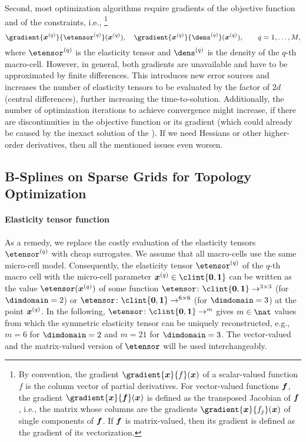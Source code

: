 Second, most optimization algorithms require gradients of the
objective function and of the constraints, i.e.,%
\footnote{%
  By convention, the gradient $\gradient{\*x}{f}(\*x)$ of a
  scalar-valued function $f$ is the column vector of partial derivatives.
  For vector-valued functions ${\boldsymbol{f}}$, the gradient $\gradient{\*x}{\*f}(\*x)$
  is defined as the transposed Jacobian of ${\boldsymbol{f}}$, i.e.,
  the matrix whose columns are the gradients $\gradient{\*x}{f_j}(\*x)$ of
  single components of ${\boldsymbol{f}}$.
  If ${\boldsymbol{f}}$ is matrix-valued, then its gradient is defined as the
  gradient of its vectorization.%
}
\begin{equation}
  \gradient{\*x^{(q)}}{\etensor^{(q)}}(\*x^{(q)}),\quad
  \gradient{\*x^{(q)}}{\dens^{(q)}}(\*x^{(q)}),\qquad
  q = 1, \dotsc, M,
\end{equation}
where $\etensor^{(q)}$ is the elasticity tensor and
$\dens^{(q)}$ is the density of the $q$-th macro-cell.
However, in general, both gradients are unavailable and
have to be approximated by finite differences.
This introduces new error sources and
increases the number of elasticity tensors to be evaluated
by the factor of $2d$ (central differences),
further increasing the time-to-solution.
Additionally, the number of optimization iterations to
achieve convergence might increase,
if there are discontinuities in the objective function
or its gradient
(which could already be caused by the inexact solution of the \fem).
If we need Hessians or other higher-order derivatives,
then all the mentioned issues even worsen.



\subsection{B-Splines on Sparse Grids for Topology Optimization}
\label{sec:622BSplines}

\paragraph{Elasticity tensor function}

As a remedy, we replace the costly evaluation of the
elasticity tensors $\etensor^{(q)}$ with cheap surrogates.
We assume that all macro-cells use the same micro-cell model.
Consequently, the elasticity tensor $\etensor^{(q)}$ of the $q$-th macro cell
with the micro-cell parameter $\*x^{(q)} \in \clint{\*0, \*1}$
can be written as the value $\etensor(\*x^{(q)})$ of some function
$\etensor\colon \clint{\*0, \*1} \to \real^{3 \times 3}$
(for $\dimdomain = 2$) or
$\etensor\colon \clint{\*0, \*1} \to \real^{6 \times 6}$
(for $\dimdomain = 3$) at the point ${\boldsymbol{x}}^{(q)}$.
In the following,
$\etensor\colon \clint{\*0, \*1} \to \real^m$
gives $m \in \nat$ values from which the symmetric elasticity tensor
can be uniquely reconstructed,
e.g., $m = 6$ for $\dimdomain = 2$ and $m = 21$ for $\dimdomain = 3$.
The vector-valued and the matrix-valued version of $\etensor$
will be used interchangeably.

